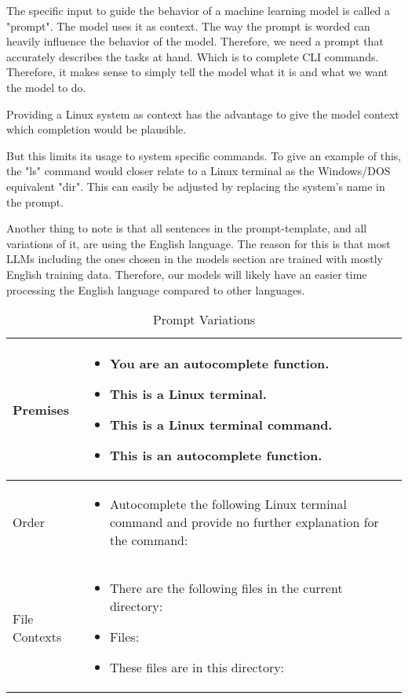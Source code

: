 The specific input to guide the behavior of a machine learning model is called a "prompt". The model uses it as context. The way the prompt is worded can heavily influence the behavior of the model. Therefore, we need a prompt that accurately describes the tasks at hand. Which is to complete CLI commands. Therefore, it makes sense to simply tell the model what it is and what we want the model to do. 




Providing a Linux system as context has the advantage to give the model context which completion would be plausible. 


But this limits its usage to system specific commands. To give an example of this, the "ls" command would closer relate to  a Linux terminal as the Windows/DOS equivalent "dir". This can easily be adjusted by replacing the system's name in the prompt.


Another thing to note is that all sentences in the prompt-template, and all variations of it, are using the English language. The reason for this is that most LLMs including the ones chosen in the models section are trained with mostly English training data. Therefore, our models will likely have an easier time processing the English language compared to other languages. 



  



\begin{table}[htbp]
    \centering
    \caption{Prompt Variations}
    \begin{tabular}{|p{5cm}|p{8cm}|}
        \hline
        Premises & 
        \begin{itemize}
            \item You are an autocomplete function.
            \item This is a Linux terminal.
            \item This is a Linux terminal command.
            \item This is an autocomplete function.
        \end{itemize}
        \\
        \hline
        Order & 
        \begin{itemize}
            \item Autocomplete the following Linux terminal command and provide no further explanation for the command:
        \end{itemize}
        \\
        \hline
        File Contexts & 
        \begin{itemize}
            \item There are the following files in the current directory:
            \item Files:
            \item These files are in this directory:
        \end{itemize}
        \\
        \hline
    \end{tabular}
\end{table}


